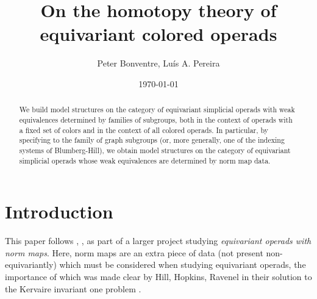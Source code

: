 \documentclass[a4paper,10pt
,draft
]{article}%
\title{On the homotopy theory of equivariant colored operads}
\author{Peter Bonventre, Lu\'is A. Pereira}%
\date{\today}
\numberwithin{equation}{section}
\numberwithin{figure}{section}
\theoremstyle{definition} %
\newcommand{\1}{\ensuremath{\mathbbm 1}}%
\begin{document}
\maketitle

\begin{abstract}
	We build model structures 
	on the category of equivariant simplicial operads
	with weak equivalences determined by families of subgroups,
	both in the context of operads with a fixed set of colors and in the context of all colored operads.
	In particular, by specifying to the family of graph subgroups 
	(or, more generally, one of the indexing systems of Blumberg-Hill),
	we obtain model structures on the category of equivariant simplicial operads
	whose weak equivalences are determined by norm map data.
\end{abstract}



\tableofcontents







\section{Introduction}

This paper follows \cite{Per18}, \cite{BP_geo}, \cite{BP_edss}
as part of a larger project studying 
\emph{equivariant operads with norm maps}.
Here, norm maps are an extra piece of data 
(not present non-equivariantly)
which must be considered
when studying equivariant operads,
the importance of which was made clear by
Hill, Hopkins, Ravenel 
in their solution to the Kervaire invariant one problem \cite{HHR16}.
\end{document}
